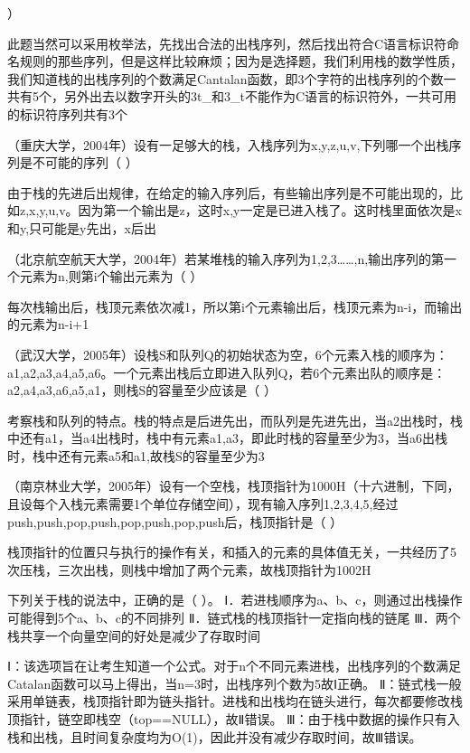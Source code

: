 ）
\par{}
\begin{solution}此题当然可以采用枚举法，先找出合法的出栈序列，然后找出符合C语言标识符命名规则的那些序列，但是这样比较麻烦；因为是选择题，我们利用栈的数学性质，我们知道栈的出栈序列的个数满足Cantalan函数，即3个字符的出栈序列的个数一共有5个，另外出去以数字开头的3t\_和3\_t不能作为C语言的标识符外，一共可用的标识符序列共有3个
\end{solution}
\question （重庆大学，2004年）设有一足够大的栈，入栈序列为x,y,z,u,v,下列哪一个出栈序列是不可能的序列（
）
\par{}
\begin{solution}由于栈的先进后出规律，在给定的输入序列后，有些输出序列是不可能出现的，比如z,x,y,u,v。因为第一个输出是z，这时x,y一定是已进入栈了。这时栈里面依次是x和y,只可能是y先出，x后出
\end{solution}
\question （北京航空航天大学，2004年）若某堆栈的输入序列为1,2,3\ldots{}\ldots{},n,输出序列的第一个元素为n,则第i个输出元素为（
）
\par{}
\begin{solution}每次栈输出后，栈顶元素依次减1，所以第i个元素输出后，栈顶元素为n-i，而输出的元素为n-i+1
\end{solution}
\question （武汉大学，2005年）设栈S和队列Q的初始状态为空，6个元素入栈的顺序为：a1,a2,a3,a4,a5,a6。一个元素出栈后立即进入队列Q，若6个元素出队的顺序是：a2,a4,a3,a6,a5,a1，则栈S的容量至少应该是（
）
\par{}
\begin{solution}考察栈和队列的特点。栈的特点是后进先出，而队列是先进先出，当a2出栈时，栈中还有a1，当a4出栈时，栈中有元素a1,a3，即此时栈的容量至少为3，当a6出栈时，栈中还有元素a5和a1,故栈S的容量至少为3
\end{solution}
\question （南京林业大学，2005年）设有一个空栈，栈顶指针为1000H（十六进制，下同，且设每个入栈元素需要1个单位存储空间），现有输入序列1,2,3,4,5,经过push,push,pop,push,pop,push,pop,push后，栈顶指针是（
）
\par{}
\begin{solution}栈顶指针的位置只与执行的操作有关，和插入的元素的具体值无关，一共经历了5次压栈，三次出栈，则栈中增加了两个元素，故栈顶指针为1002H
\end{solution}
\question 下列关于栈的说法中，正确的是（ ）。
Ⅰ．若进栈顺序为a、b、c，则通过出栈操作可能得到5个a、b、c的不同排列
Ⅱ．链式栈的栈顶指针一定指向栈的链尾
Ⅲ．两个栈共享一个向量空间的好处是减少了存取时间
\par{}
\begin{solution}Ⅰ：该选项旨在让考生知道一个公式。对于n个不同元素进栈，出栈序列的个数满足Catalan函数可以马上得出，当n=3时，出栈序列个数为5故Ⅰ正确。
Ⅱ：链式栈一般采用单链表，栈顶指针即为链头指针。进栈和出栈均在链头进行，每次都要修改栈顶指针，链空即栈空（top==NULL），故Ⅱ错误。
Ⅲ：由于栈中数据的操作只有入栈和出栈，且时间复杂度均为O(1)，因此并没有减少存取时间，故Ⅲ错误。
\end{solution}

